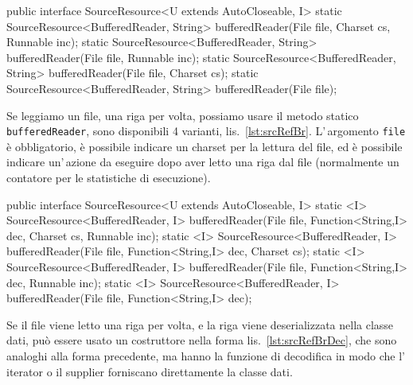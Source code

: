\begin{elisting}[!htb]
\begin{javacode}
public interface SourceResource<U extends AutoCloseable, I> {
    static SourceResource<BufferedReader, String> bufferedReader(File file, Charset cs, Runnable inc);
    static SourceResource<BufferedReader, String> bufferedReader(File file, Runnable inc);
    static SourceResource<BufferedReader, String> bufferedReader(File file, Charset cs);
    static SourceResource<BufferedReader, String> bufferedReader(File file);
}
\end{javacode}
\caption{Metodi creare una risorsa \texttt{SourceResource<BufferedReader, String>}}
\label{lst:srcRefBr}
\end{elisting}
Se leggiamo un file, una riga per volta, possiamo usare il metodo statico
\texttt{bufferedReader}, sono disponibili 4 varianti, lis.~\ref{lst:srcRefBr}.
L'\,argomento \texttt{file} è obbligatorio, è possibile indicare un charset per
la lettura del file, ed è possibile indicare un'\,azione da eseguire dopo aver
letto una riga dal file (normalmente un contatore per le statistiche di
esecuzione).

\begin{elisting}[!htb]
\begin{javacode}
public interface SourceResource<U extends AutoCloseable, I> {
    static <I> SourceResource<BufferedReader, I> bufferedReader(File file, Function<String,I> dec,
                                                                Charset cs, Runnable inc);
    static <I> SourceResource<BufferedReader, I> bufferedReader(File file, Function<String,I> dec, Charset cs);
    static <I> SourceResource<BufferedReader, I> bufferedReader(File file, Function<String,I> dec, Runnable inc);
    static <I> SourceResource<BufferedReader, I> bufferedReader(File file, Function<String,I> dec);
}
\end{javacode}
\caption[Metodi creare una risorsa \texttt{SourceResource<BufferedReader,I>}
con funzione di decodifica]{Metodi creare una risorsa \texttt{SourceResource<BufferedReader,I>}
con funzione di decodifica \texttt{String}~$\mapsto$~\texttt{I}}
\label{lst:srcRefBrDec}
\end{elisting}
Se il file viene letto una riga per volta, e la riga viene deserializzata nella
classe dati, può essere usato un costruttore nella forma
lis.~\ref{lst:srcRefBrDec}, che sono analoghi alla forma precedente, ma hanno
la funzione di decodifica in modo che l'\,iterator o il supplier forniscano
direttamente la classe dati.

